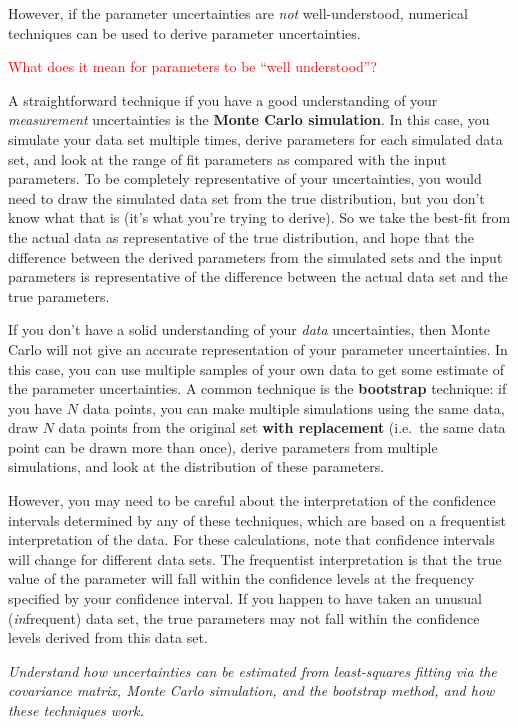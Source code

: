 \documentclass{article}
\newcommand{\test}[1]{%
    \begin{center}
        \colorbox{hl}{\parbox{0.9\textwidth}{\emph{\centering #1}}}
    \end{center}}
\begin{document}
However, if the parameter uncertainties are \emph{not} well-understood,
numerical techniques can be used to derive parameter uncertainties.

\textcolor{red}{What does it mean for parameters to be ``well understood''?}

A straightforward technique if you have a good understanding of your
\emph{measurement} uncertainties is the \textbf{Monte Carlo simulation}. In this
case, you simulate your data set multiple times, derive parameters for each
simulated data set, and look at the range of fit parameters as compared with
the input parameters.  To be completely representative of your uncertainties,
you would need to draw the simulated data set from the true distribution, but
you don't know what that is (it's what you're trying to derive).  So we take
the best-fit from the actual data as representative of the true distribution,
and hope that the difference between the derived parameters from the
simulated sets and the input parameters is representative of the difference
between the actual data set and the true parameters.

If you don't have a solid understanding of your \emph{data} uncertainties, then
Monte Carlo will not give an accurate representation of your parameter
uncertainties. In this case, you can use multiple samples of your own data to
get some estimate of the parameter uncertainties. A common technique is the
\textbf{bootstrap} technique: if you have $N$ data points, you can make
multiple simulations using the same data, draw $N$ data points from the
original set \textbf{with replacement} (i.e.\ the same data point can be drawn
more than once), derive parameters from multiple simulations, and look at the
distribution of these parameters.

However, you may need to be careful about the interpretation of the confidence
intervals determined by any of these techniques, which are based on a
frequentist interpretation of the data. For these calculations, note that
confidence intervals will change for different data sets. The frequentist
interpretation is that the true value of the parameter will fall within the
confidence levels at the frequency specified by your confidence interval. If
you happen to have taken an unusual (\emph{in}frequent) data set, the true
parameters may not fall within the confidence levels derived from
this data set.

\test{Understand how uncertainties can be estimated from least-squares
fitting via the covariance matrix, Monte Carlo simulation, and the
bootstrap method, and how these techniques work.}
\end{document}

